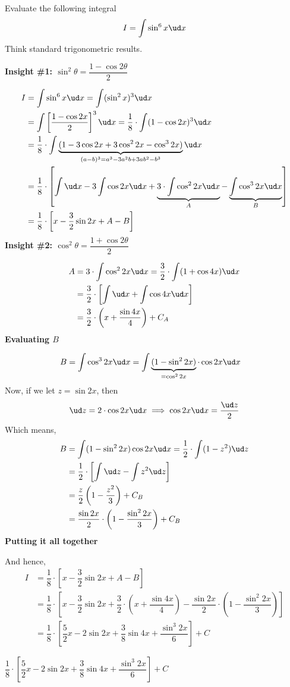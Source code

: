 
\question Evaluate the following integral 
\[ I = \int\sin^6 x\ud x \]
Think standard trigonometric results.

\begin{solution}
  \textbf{Insight \#1: $\sin^2\theta = \dfrac{1-\cos 2\theta}{2}$}
  
  \begin{align}
    I &= \int\sin^6 x\ud x = \int(\sin^2 x)^3\ud x \\
    &= \int\left[\dfrac{1-\cos 2x}{2} \right]^3\ud x = \dfrac{1}{8}\cdot\int (1-\cos 2x)^3\ud x \\
    &= \dfrac{1}{8}\cdot\int\underbrace{(1-3\cos 2x + 3\cos^2 2x - \cos^3 2x)}_{(a-b)^3 = a^3 - 3a^2b + 3ab^2 - b^3}\ud x \\
    &= \dfrac{1}{8}\cdot\left[\int\ud x - 3\int\cos 2x\ud x + \underbrace{3\cdot\int\cos^2 2x\ud x}_{A} - \underbrace{\int\cos^3 2x\ud x}_{B} \right] \\
    &= \dfrac{1}{8}\cdot\left[ x -\dfrac{3}{2}\sin 2x + A - B \right]
  \end{align}
  \textbf{Insight \#2: $\cos^2\theta = \dfrac{1+\cos 2\theta}{2}$}

  \begin{align}
    A &= 3\cdot\int\cos^2 2x\ud x = \dfrac{3}{2}\cdot\int(1+\cos 4x)\ud x \\
      &= \dfrac{3}{2}\cdot\left[ \int\ud x + \int\cos 4x\ud x \right] \\
      &= \dfrac{3}{2}\cdot\left( x + \dfrac{\sin 4x}{4} \right) + C_A
  \end{align} 
  \textbf{Evaluating $B$}

  \begin{align}
    B &= \int\cos^3 2x\ud x = \int\underbrace{(1-\sin^2 2x)}_{=\cos^2 2x}\cdot\cos 2x\ud x
  \end{align}
  Now, if we let $z = \sin 2x$, then 
  \[ \ud z = 2\cdot\cos 2x\ud x \implies \cos 2x\ud x = \dfrac{\ud z}{2} \]
  Which means, 
  \begin{align}
    B &= \int(1-\sin^2 2x)\cos 2x\ud x = \dfrac{1}{2}\cdot\int (1-z^2)\ud z \\
     &= \dfrac{1}{2}\cdot\left[ \int\ud z - \int z^2\ud z \right] \\
     & = \dfrac{z}{2}\left( 1 - \dfrac{z^2}{3} \right) + C_B \\
     & = \dfrac{\sin 2x}{2}\cdot\left( 1-\dfrac{\sin^2 2x}{3}\right) + C_B 
  \end{align}
  \textbf{Putting it all together}

  And hence, 
  \begin{align}
    I &= \dfrac{1}{8}\cdot\left[ x -\dfrac{3}{2}\sin 2x + A - B \right] \\
      &= \dfrac{1}{8}\cdot\left[ x - \dfrac{3}{2}\sin 2x + 
         \dfrac{3}{2}\cdot\left( x + \dfrac{\sin 4x}{4} \right) - 
         \dfrac{\sin 2x}{2}\cdot\left( 1-\dfrac{\sin^2 2x}{3}\right)\right] \\
      &= \dfrac{1}{8}\cdot\left[\dfrac{5}{2}x - 2\sin 2x + \dfrac{3}{8}\sin 4x + \dfrac{\sin^3 2x}{6} \right] + C 
  \end{align}
\end{solution}

\ifprintanswers
  \begin{codex}
    $\dfrac{1}{8}\cdot\left[\dfrac{5}{2}x - 2\sin 2x + \dfrac{3}{8}\sin 4x + \dfrac{\sin^3 2x}{6} \right] + C$
  \end{codex}
\fi
